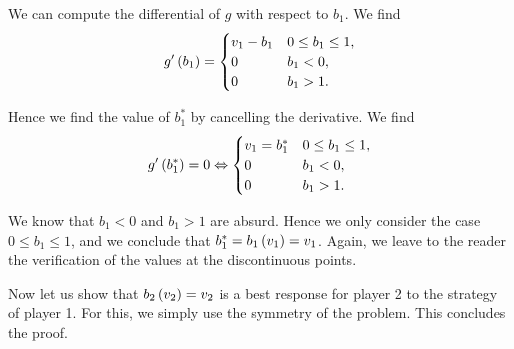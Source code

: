 We can compute the differential of $g$ with respect to $b_1$. We find
\begin{equation*}
    g' \left(b_1\right)
    =
    \begin{cases}
       v_1 - b_1  & 0 \leq b_1 \leq 1, \\
       0 & b_1 < 0, \\
       0 & b_1 > 1. \\
     \end{cases}
\end{equation*}

Hence we find the value of $b_1^{*}$ by cancelling the derivative. We find
\begin{equation*}
    g' \left(b_1^{*}\right) = 0
    \Leftrightarrow
    \begin{cases}
       v_1 = b_1^{*}  & 0 \leq b_1 \leq 1, \\
       0 & b_1 < 0, \\
       0 & b_1 > 1. \\
     \end{cases}
\end{equation*}

We know that $b_1 < 0$ and $b_1 > 1$ are absurd. Hence we only consider the case $0 \leq b_1 \leq 1$, and we conclude that $b_1^{*} = b_1 \left(v_1\right) = v_1$. Again, we leave to the reader the verification of the values at the discontinuous points.


\vspace{5mm}

Now let us show that $b_2 \left(v_2\right) = v_2$ is a best response for player 2 to the strategy of player 1. For this, we simply use the symmetry of the problem. This concludes the proof.
